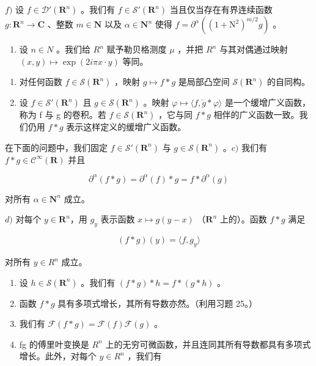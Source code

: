 \(f)\) 设 \(f \in \mathcal{D}'(\mathbf{R}^n)\) 。我们有 \(f \in \mathcal{S}'(\mathbf{R}^n)\) 当且仅当存在有界连续函数 \(g\colon \mathbf{R}^n \to \mathbf{C}\) 、整数 \(m \in \mathbf{N}\) 以及 \(\alpha \in \mathbf{N}^n\) 使得 \(f = \partial^\alpha((1 + \mathrm{N}^2)^{m/2}g)\) 。

\begin{enumerate}
\def\labelenumi{\arabic{enumi})}
\setcounter{enumi}{25}
\tightlist
\item
  设 \(n \in N\) 。我们给 \(R^{n}\) 赋予勒贝格测度 \(\mu\) ，并把 \(R^{n}\) 与其对偶通过映射 \((x, y) \mapsto \exp(2i\pi x \cdot y)\) 等同。
\end{enumerate}

\begin{enumerate}
\def\labelenumi{\alph{enumi})}
\item
  对任何函数 \(f \in \mathcal{S}(\mathbf{R}^n)\) ，映射 \(g \mapsto f * g\) 是局部凸空间 \(\mathcal{S}(\mathbf{R}^n)\) 的自同构。
\item
  设 \(f \in \mathcal{S}'(\mathbf{R}^{n})\) 且 \(g \in \mathcal{S}(\mathbf{R}^{n})\) 。映射 \(\varphi \mapsto \langle f, \check{g} * \varphi \rangle\) 是一个缓增广义函数，称为 f 与 g 的卷积。若 \(f \in \mathcal{S}(\mathbf{R}^{n})\) ，它与同 \(f * g\) 相伴的广义函数一致。我们仍用 \(f * g\) 表示这样定义的缓增广义函数。
\end{enumerate}

在下面的问题中，我们固定 \(f \in \mathcal{S}'(\mathbf{R}^n)\) 与 \(g \in \mathcal{S}(\mathbf{R}^n)\) 。\(c)\) 我们有 \(f * g \in \mathcal{C}^\infty(\mathbf{R})\) 并且

\[
\partial^ {\alpha} (f * g) = \partial^ {\alpha} (f) * g = f * \partial^ {\alpha} (g)
\]

对所有 \(\alpha\in\mathbf{N}^{n}\) 成立。

\(d)\) 对每个 \(y \in \mathbf{R}^n\)，用 \(g_y\) 表示函数 \(x \mapsto g(y - x)\) （\(\mathbf{R}^n\) 上的）。函数 \(f * g\) 满足

\[
(f * g) (y) = \langle f, g _ {y} \rangle
\]

对所有 \(y \in R^{n}\) 成立。

\begin{enumerate}
\def\labelenumi{\alph{enumi})}
\setcounter{enumi}{4}
\item
  设 \(h \in \mathcal{S}(\mathbf{R}^n)\) 。我们有 \((f*g)*h = f*(g*h)\) 。
\item
  函数 \(f*g\) 具有多项式增长，其所有导数亦然。（利用习题 25。）
\item
  我们有 \(\mathcal{F}(f*g) = \mathcal{F}(f)\mathcal{F}(g)\) 。
\item
  fg 的傅里叶变换是 \(R^{n}\) 上的无穷可微函数，并且连同其所有导数都具有多项式增长。此外，对每个 \(y \in R^{n}\) ，我们有
\end{enumerate}

